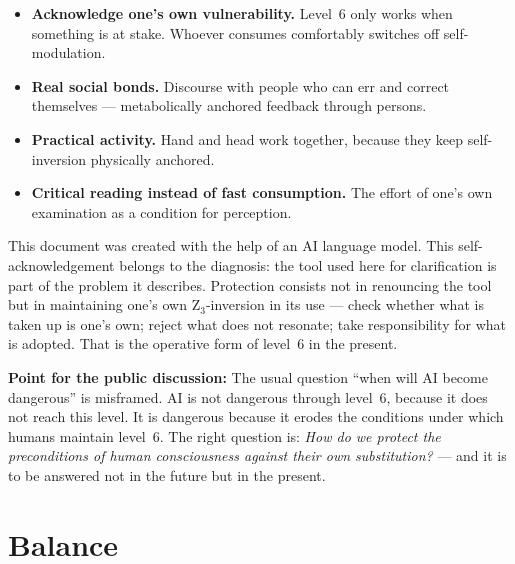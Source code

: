 \begin{itemize}
\item \textbf{Acknowledge one's own vulnerability.} Level~6 only works when something is at stake. Whoever consumes comfortably switches off self-modulation.
\item \textbf{Real social bonds.} Discourse with people who can err and correct themselves --- metabolically anchored feedback through persons.
\item \textbf{Practical activity.} Hand and head work together, because they keep self-inversion physically anchored.
\item \textbf{Critical reading instead of fast consumption.} The effort of one's own examination as a condition for perception.
\end{itemize}

\begin{philosophical}
This document was created with the help of an AI language model. This self-acknowledgement belongs to the diagnosis: the tool used here for clarification is part of the problem it describes. Protection consists not in renouncing the tool but in maintaining one's own Z$_3$-inversion in its use --- check whether what is taken up is one's own; reject what does not resonate; take responsibility for what is adopted. That is the operative form of level~6 in the present.
\end{philosophical}

\textbf{Point for the public discussion:} The usual question ``when will AI become dangerous'' is misframed. AI is not dangerous through level~6, because it does not reach this level. It is dangerous because it erodes the conditions under which humans maintain level~6. The right question is: \emph{How do we protect the preconditions of human consciousness against their own substitution?} --- and it is to be answered not in the future but in the present.

\section{Balance}\label{sec:balance}

